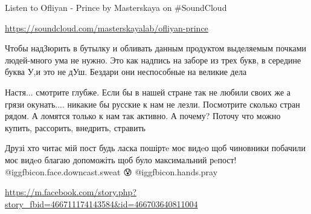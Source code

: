 \begin{itemize}
Listen to Ofliyan - Prince by Masterskaya on \#SoundCloud

\url{https://soundcloud.com/masterskayalab/ofliyan-prince}


Чтобы надЗюрить в бутылку и обливать данным продуктом выделяемым почками людей-много ума не нужно.
Это как надпись на заборе из трех букв, в середине буква У,и это не дУш.
Бездари они неспособные на великие дела


Настя... смотрите глубже. Если бы в нашей стране так не любили своих же а грязи
окунать.... никакие бы русские к нам не лезли. Посмотрите сколько стран рядом.
А ломятся только к нам так активно. А почему? Поточу что можно купить,
рассорить, внедрить, стравить


Друзі хто читає мій пост будь ласка пошіртe моє видeо щоб чиновники побачили
моє видeо благаю допоможіть щоб було максимальний рeпост!  @igg{fbicon.face.downcast.sweat} 😰 @igg{fbicon.hands.pray} 

\url{https://m.facebook.com/story.php?story_fbid=466711174143584&id=466703640811004}

\end{itemize} %
